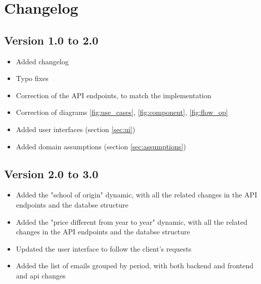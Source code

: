 \chapter{Changelog}
\section{Version 1.0 to 2.0}
\begin{itemize}
    \item Added changelog
    \item Typo fixes
    \item Correction of the API endpoints, to match the implementation
    \item Correction of diagrams \ref{fig:use_cases}, \ref{fig:component}, \ref{fig:flow_op}
    \item Added user interfaces (section \ref{sec:ui})
    \item Added domain assumptions (section \ref{sec:assumptions})
\end{itemize}
\section{Version 2.0 to 3.0}
\begin{itemize}
    \item Added the "school of origin" dynamic, with all the related changes in the API endpoints and the databse structure
    \item Added the "price different from year to year" dynamic, with all the related changes in the API endpoints and the databse structure
    \item Updated the user interface to follow the client's requests
    \item Added the list of emails grouped by period, with both backend and frontend and api changes
\end{itemize}